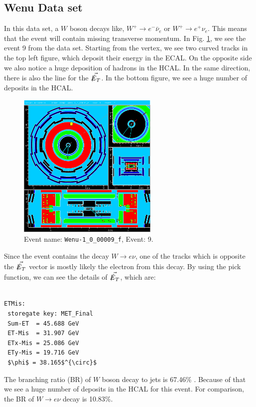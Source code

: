 \documentclass[a4paper]{report}
\numberwithin{equation}{section}
\begin{document}
\subsection{Wenu Data set}

In this data set, a $W$ boson decays like, $W^+ \rightarrow e^- \bar{\nu}_e$ or $W^+ \rightarrow e^+ \nu_e$. This means that the event will contain missing transverse momentum. In Fig. \ref{fig:wenu}, we see the event 9 from the data set. Starting from the vertex, we see two curved tracks in the top left figure, which deposit their energy in the ECAL. On the opposite side we also notice a huge deposition of hadrons in the HCAL. In the same direction, there is also the line for the $\vec{\slashed{E}_T}$. In the bottom figure, we see a huge number of deposits in the HCAL. 

\begin{figure}[htpb]
    \centering
    \includegraphics[width=0.6\textwidth]{Wenu-1_0_00009_f-YX-RZ-RZ-YX-2022-05-23-13-13-30}
    \caption{Event name: \texttt{Wenu-1\_0\_00009\_f}, Event: 9.}
    \label{fig:wenu}
\end{figure}

Since the event contains the decay $W \rightarrow e \nu$, one of the tracks which is opposite the $\vec{\slashed{E}_T}$ vector is mostly likely the electron from this decay. By using the pick function, we can see the details of $\vec{\slashed{E}_T}$, which are:

\begin{lstlisting}

ETMis:
 storegate key: MET_Final
 Sum-ET  = 45.688 GeV
 ET-Mis  = 31.907 GeV
 ETx-Mis = 25.086 GeV
 ETy-Mis = 19.716 GeV
 $\phi$ = 38.165$^{\circ}$
\end{lstlisting}
The branching ratio (BR) of $W$ boson decay to jets is 67.46\% \cite{CMS:2022mhs}. Because of that we see a huge number of deposits in the HCAL for this event. For comparison, the BR of $W \rightarrow e \nu$ decay is 10.83\%. 
\end{document}
